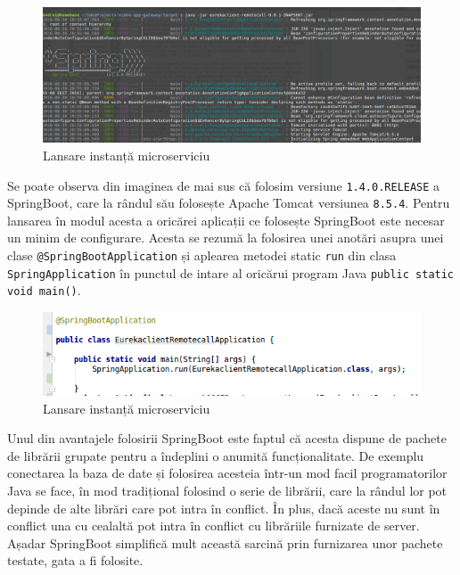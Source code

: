 \documentclass[12pt, a4paper, oneside, romanian]{teza-upb}
\begin{document}
\begin{figure}[ht]
\centering
\includegraphics[scale=0.4]{img/spring-boot-start.png}
\caption{Lansare instanță microserviciu}
\label{fig:arhi_componente}
\end{figure}

Se poate observa din imaginea de mai sus că folosim versiune \texttt{1.4.0.RELEASE} a SpringBoot, care la rândul său folosește Apache Tomcat versiunea \texttt{8.5.4}. Pentru lansarea în modul acesta a oricărei aplicații ce folosește SpringBoot este necesar un minim de configurare. Acesta se rezumă la folosirea unei anotări asupra unei clase \texttt{@SpringBootApplication} și aplearea metodei static \texttt{run} din clasa \texttt{SpringApplication} în punctul de intare al oricărui program Java \texttt{public static void main()}.

\begin{figure}[ht]
\centering
\includegraphics[scale=0.5]{img/spring-boot-min-config.png}
\caption{Lansare instanță microserviciu}
\label{fig:arhi_componente}
\end{figure}

Unul din avantajele folosirii SpringBoot este faptul că acesta dispune de pachete de librării grupate pentru a îndeplini o anumită funcționalitate. De exemplu conectarea la baza de date și folosirea acesteia într-un mod facil programatorilor Java se face, în mod tradițional folosind o serie de librării, care la rândul lor pot depinde de alte librări care pot intra în conflict. În plus, dacă aceste nu sunt în conflict una cu cealaltă pot intra în conflict cu librăriile furnizate de server. Așadar SpringBoot simplifică mult această sarcină prin furnizarea unor pachete testate, gata a fi folosite. 
\end{document}
